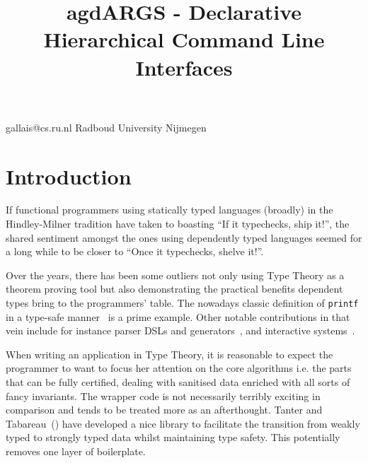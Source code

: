 \documentclass[preprint,9pt]{sigplanconf}
\begin{document}
\newcommand{\AB}[1]{\AgdaBound{#1}}
\newcommand{\AD}[1]{\AgdaDatatype{#1}}
\newcommand{\AF}[1]{\AgdaFunction{#1}}
\newcommand{\AS}[1]{\AgdaSymbol{#1}}

\newcommand{\command}[1]{\colorbox{lightgray}{\texttt{#1}}}


\title{agdARGS - Declarative Hierarchical Command Line Interfaces}

           {gallais@cs.ru.nl}
           {Radboud University Nijmegen}
\maketitle

\section{Introduction}

If functional programmers using statically typed languages (broadly)
in the Hindley-Milner tradition have taken to boasting 
``If it typechecks, ship it!'', the shared sentiment amongst the ones
using dependently typed languages seemed for a long while to be closer
to ``Once it typechecks, shelve it!''.

Over the years, there has been some outliers not only using Type Theory
as a theorem proving tool but also demonstrating the practical benefits
dependent types bring to the programmers' table. The nowadays classic
definition of \texttt{printf} in a type-safe
manner~\cite{augustsson1998cayenne} is a prime example. Other notable
contributions in that vein include for instance parser DSLs and
generators~\cite{danielsson2010total,stump2016book},
and interactive systems~\cite{brady2014resource,claret2015mechanical}.

When writing an application in Type Theory, it is reasonable to expect
the programmer to want to focus her attention on the core algorithms
i.e. the parts that can be fully certified, dealing with sanitised data
enriched with all sorts of fancy invariants. The wrapper code is not
necessarily terribly exciting in comparison and tends to be treated
more as an afterthought.
Tanter and Tabareau~(\citeyear{tanter2015gradual}) have developed a
nice library to facilitate the transition from weakly typed to strongly
typed data whilst maintaining type safety. This potentially removes one
layer of boilerplate.
\end{document}
